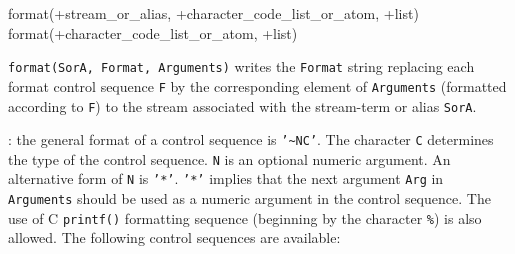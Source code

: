 \begin{TemplatesOneCol}
format(+stream\_or\_alias, +character\_code\_list\_or\_atom,
+list)\\
format(+character\_code\_list\_or\_atom, +list)

\end{TemplatesOneCol}

\Description

\texttt{format(SorA, Format, Arguments)} writes the \texttt{Format} string
replacing each format control sequence \texttt{F} by the corresponding
element of \texttt{Arguments} (formatted according to \texttt{F}) to the
stream associated with the stream-term or alias \texttt{SorA}.

: the general format of a control sequence
is \texttt{'\~{}NC'}. The character \texttt{C} determines the type of
the control sequence. \texttt{N} is an optional numeric argument. An
alternative form of \texttt{N} is \texttt{'*'}. \texttt{'*'} implies
that the next argument \texttt{Arg} in \texttt{Arguments} should be
used as a numeric argument in the control sequence. The use of C
\texttt{printf()} formatting sequence (beginning by the character
\texttt{\%}) is also allowed. The following control sequences are
available:

